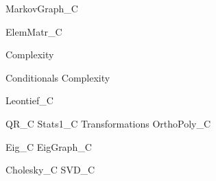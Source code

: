 \documentclass{newsiambook}
\begin{document}
{MarkovGraph_C}
%





{ElemMatr_C}
%

\begin{python}
{Complexity}
%
%
\end{python}

\begin{matlab}
{Conditionals}
{Complexity}
%
%
\end{matlab}

{Leontief_C}
%


{QR_C}
{Stats1_C}
{Transformations}
{OrthoPoly_C}
%
%

{Eig_C}
{EigGraph_C}
%
%

{Cholesky_C}
{SVD_C}
%
%
\end{document}
